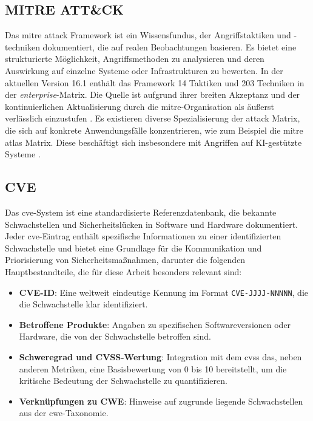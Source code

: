 \subsection{MITRE ATT\&CK}
Das \gls{mitre} \gls{attack} Framework ist ein Wissensfundus, der Angriffstaktiken und -techniken dokumentiert, die auf realen Beobachtungen basieren. Es bietet eine strukturierte Möglichkeit, Angriffsmethoden zu analysieren und deren Auswirkung auf einzelne Systeme oder Infrastrukturen zu bewerten. In der aktuellen Version 16.1 enthält das Framework 14 Taktiken und 203 Techniken in der \textit{enterprise}-Matrix. Die Quelle ist aufgrund ihrer breiten Akzeptanz und der kontinuierlichen Aktualisierung durch die \gls{mitre}-Organisation als äußerst verlässlich einzustufen \autocite{MITREATTCK}. Es existieren diverse Spezialisierung der \gls{attack} Matrix, die sich auf konkrete Anwendungsfälle konzentrieren, wie zum Beispiel die \gls{mitre} \gls{atlas} Matrix. Diese beschäftigt sich insbesondere mit Angriffen auf KI-gestützte Systeme \autocite{ATLASMatrixMITRE}.

\subsection{CVE}
\label{bg:cve}
Das \gls{cve}-System ist eine standardisierte Referenzdatenbank, die bekannte Schwachstellen und Sicherheitslücken in Software und Hardware dokumentiert. Jeder \gls{cve}-Eintrag enthält spezifische Informationen zu einer identifizierten Schwachstelle und bietet eine Grundlage für die Kommunikation und Priorisierung von Sicherheitsmaßnahmen, darunter die folgenden Hauptbestandteile, die für diese Arbeit besonders relevant sind:

\begin{itemize}
    \item \textbf{CVE-ID}: Eine weltweit eindeutige Kennung im Format \texttt{CVE-JJJJ-NNNNN}, die die Schwachstelle klar identifiziert.
    \item \textbf{Betroffene Produkte}: Angaben zu spezifischen Softwareversionen oder Hardware, die von der Schwachstelle betroffen sind.
    \item \textbf{Schweregrad und CVSS-Wertung}: Integration mit dem \gls{cvss} das, neben anderen Metriken, eine Basisbewertung von 0 bis 10 bereitstellt, um die kritische Bedeutung der Schwachstelle zu quantifizieren.
    \item \textbf{Verknüpfungen zu CWE}: Hinweise auf zugrunde liegende Schwachstellen aus der \gls{cwe}-Taxonomie.
\end{itemize}

